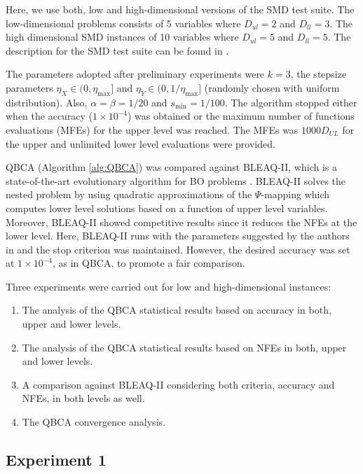 \documentclass[conference]{IEEEtran}
\theoremstyle{definition}
\begin{document}
Here, we use both, low and high-dimensional versions of the SMD test suite. The
low-dimensional problems consists of 5 variables where $D_{ul} = 2$ and $D_{ll}  = 3$.
The high dimensional SMD instances of 10 variables where $D_{ul} = 5$ and $D_{ll}  = 5$.
The description for the SMD test suite can be found in \cite{sinha2014test}.


The parameters adopted after preliminary experiments were $k = 3$, the stepsize
parameters $\eta_{X} \in (0, \eta_{\max}]$ and $\eta_{Y} \in (0, 1/\eta_{\max}]$
(randomly chosen with uniform distribution). Also, $\alpha = \beta = 1 / 20$ and
$s_{\min} = 1/100$.  The  algorithm stopped either when the accuracy ($1\times 10^{-4}$)
was obtained or the maximum number of functions evaluations (MFEs) for the upper
level was reached.
% 
% 
The MFEs was $1000D_{UL}$ for the upper and unlimited lower level evaluations were
provided.
% 


% 
QBCA (Algorithm \ref{alg:QBCA}) was compared against BLEAQ-II, which is a state-of-the-art
evolutionary algorithm for BO problems \cite{sinha2018review,sinha2013efficient}.
BLEAQ-II solves the nested problem by using quadratic approximations of the
$\Psi$-mapping which computes lower level solutions based on a function of upper
level variables. Moreover, BLEAQ-II showed competitive results since it reduces
the NFEs at the lower level. Here, BLEAQ-II runs with the parameters suggested by
the authors in \cite{sinha2018review,sinha2017bilevel} and the stop criterion was
maintained.  However, the desired accuracy was set at $1\times 10^{-4}$, as in
QBCA, to promote a fair comparison.

Three experiments were carried out for low and high-dimensional instances:
% 
\begin{enumerate}
    \item The analysis of the QBCA statistical results based on accuracy in both,
          upper and lower levels.
    \item The analysis of the QBCA statistical results based on NFEs in both,
          upper and lower levels. 
    \item A comparison against BLEAQ-II considering both criteria, accuracy and
          NFEs, in both levels as well.
    \item  The QBCA convergence analysis.
\end{enumerate}
% 


\subsection{Experiment 1}
\end{document}
